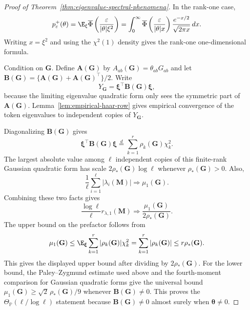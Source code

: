 \documentclass{article}
\newcommand{\Prob}{\mathbb{P}}
\newcommand{\weak}{\Rightarrow}
\newcommand{\bA}{\mathbf{A}}
\newcommand{\bB}{\mathbf{B}}
\newcommand{\bM}{\mathbf{M}}
\newcommand{\bG}{\mathbf{G}}
\newcommand{\barPhi}{\overline{\Phi}}
\theoremstyle{remark}
\begin{document}
\begin{proof}[Proof of Theorem~\ref{thm:eigenvalue-spectral-phenomena}]
In the rank-one case,
\begin{equation}
    p_\varepsilon^+(\theta)
    =
    \E_{\xi}
    \barPhi\left(\frac{\varepsilon}{|\theta|\xi^2}\right)
    =
    \int_0^\infty
    \barPhi\left(\frac{\varepsilon}{|\theta|x}\right)
    \frac{e^{-x/2}}{\sqrt{2\pi x}}\,dx .
    \label{eq:rank-one-tail-formula}
\end{equation}
Writing $x=\xi^2$ and using the $\chi^2(1)$ density gives the rank-one
one-dimensional formula.

Condition on $\bG$.  Define $\bA(\bG)$ by
$A_{ab}(\bG)=\theta_{ab}G_{ab}$ and let
$\bB(\bG)=\{\bA(\bG)+\bA(\bG)^\top\}/2$.  Write
\[
    Y_{\bG}=\boldsymbol{\xi}^\top\bB(\bG)\boldsymbol{\xi},
\]
because the limiting eigenvalue quadratic form only sees the symmetric part of
$\bA(\bG)$.  Lemma~\ref{lem:empirical-haar-row} gives empirical convergence of
the token eigenvalues to independent copies of $Y_{\bG}$.

Diagonalizing $\bB(\bG)$ gives
\[
    \boldsymbol{\xi}^\top\bB(\bG)\boldsymbol{\xi}
    \stackrel{d}{=}
    \sum_{k=1}^r\rho_k(\bG)\chi_k^2.
\]
The largest absolute value among $\ell$ independent copies of this finite-rank
Gaussian quadratic form has scale $2\rho_*(\bG)\log\ell$ whenever
$\rho_*(\bG)>0$.  Also,
\[
    \frac{1}{\ell}\sum_{i=1}^{\ell}|\lambda_i(\bM)|
    \weak
    \mu_1(\bG).
\]
Combining these two facts gives
\begin{equation}
    \frac{\log\ell}{\ell}r_{\lambda,1}(\bM)
    \weak
    \frac{\mu_1(\bG)}{2\rho_*(\bG)}.
    \label{eq:eigenvalue-stable-rank-prefactor}
\end{equation}
The upper bound on the prefactor follows from
\[
    \mu_1(\bG)
    \leq
    \E_{\boldsymbol{\xi}}\sum_{k=1}^r|\rho_k(\bG)|\chi_k^2
    =
    \sum_{k=1}^r|\rho_k(\bG)|
    \leq
    r\rho_*(\bG).
\]
This gives the displayed upper bound after dividing by $2\rho_*(\bG)$.  For
the lower bound, the Paley--Zygmund estimate used above and the fourth-moment
comparison for Gaussian quadratic forms give the universal bound
$\mu_1(\bG)\geq \sqrt2\,\rho_*(\bG)/9$ whenever $\bB(\bG)\neq0$.  This proves
the $\Theta_{\Prob}(\ell/\log\ell)$ statement because $\bB(\bG)\neq0$ almost
surely when $\boldsymbol{\theta}\neq0$.


\end{proof}
\end{document}
